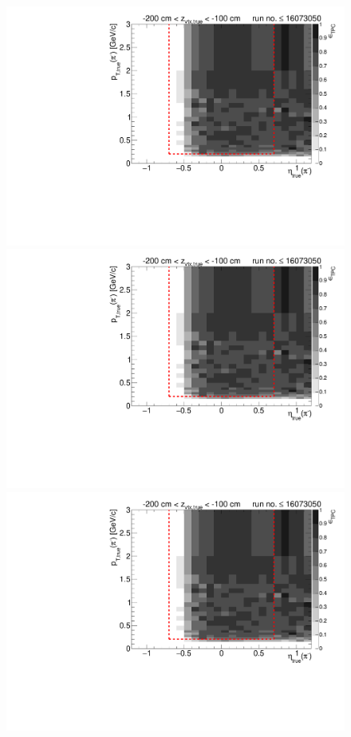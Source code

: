 \begin{figure}[hb]
{  \includegraphics[width=\linewidth,page=6]{graphics/eff/Eff2D_TPC_pion_Minus_RunRange1.pdf}\\
  \includegraphics[width=\linewidth,page=8]{graphics/eff/Eff2D_TPC_pion_Minus_RunRange1.pdf}\\
  \includegraphics[width=\linewidth,page=10]{graphics/eff/Eff2D_TPC_pion_Minus_RunRange1.pdf}
}%
\end{figure}
